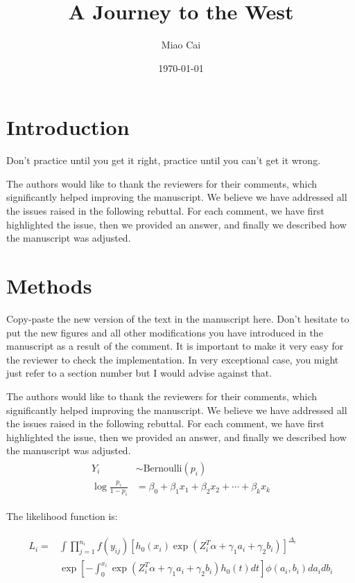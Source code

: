 \documentclass[12pt,a4paper]{article}
\title{A Journey to the West}
\author{Miao Cai}
\date{\today}
\begin{document}
\maketitle

\section{Introduction}
\begin{mdframed}[style=greybox] 
Don't practice until you get it right, practice until you can't get it wrong.
\end{mdframed}

The authors would like to thank the reviewers for their comments, which significantly helped improving the manuscript. We believe we have addressed all the issues raised in the following rebuttal. For each comment, we have first highlighted the issue, then we provided an answer, and finally we described how the manuscript was adjusted.



\section{Methods}
Copy-paste the new version of the text in the manuscript here. Don't hesitate to put the new figures and all other modifications you have introduced in the manuscript as a result of the comment. It is important to make it very easy for the reviewer to check the implementation. In very exceptional case, you might just refer to a section number but I would advise against that.

The authors would like to thank the reviewers for their comments, which significantly helped improving the manuscript. We believe we have addressed all the issues raised in the following rebuttal. For each comment, we have first highlighted the issue, then we provided an answer, and finally we described how the manuscript was adjusted.
\begin{align}
\begin{split}
Y_i &\sim \text{Bernoulli}(p_i)\\	
\log \frac{p_i}{1 - p_i} & = \beta_0 + \beta_1x_1 + \beta_2x_2 + \cdots + \beta_kx_k	
\end{split}
\end{align}

The likelihood function is:

\begin{align}
\begin{split}
L_{i}=& \int \prod_{j=1}^{n_{i}} f\left(y_{i j}\right)\left[h_{0}\left(x_{i}\right) \exp \left(Z_{i}^{T} \alpha+\gamma_{1} a_{i}+\gamma_{2} b_{i}\right)\right]^{\Delta_{i}} \\ 
& \exp \left[-\int_{0}^{x_{i}} \exp \left(Z_{i}^{T} \alpha+\gamma_{1} a_{i}+\gamma_{2} b_{i}\right) h_{0}(t) d t\right] \phi\left(a_{i}, b_{i}\right) d a_{i} d b_{i} 
\end{split}
\end{align}
\end{document}
